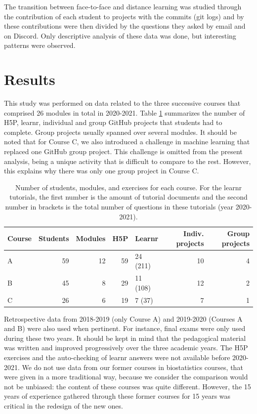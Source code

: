 \documentclass{aims}
\theoremstyle{definition}
\begin{document}
The transition between face-to-face and distance learning was studied
through the contribution of each student to projects with the commits
(git logs) and by these contributions were then divided by the questions
they asked by email and on Discord. Only descriptive analysis of these
data was done, but interesting patterns were observed.

\hypertarget{results}{%
\section{Results}\label{results}}

This study was performed on data related to the three successive courses
that comprised 26 modules in total in 2020-2021. Table
\ref {tab:tab_course} summarizes the number of H5P, learnr, individual
and group GitHub projects that students had to complete. Group projects
usually spanned over several modules. It should be noted that for Course
C, we also introduced a challenge in machine learning that replaced one
GitHub group project. This challenge is omitted from the present
analysis, being a unique activity that is difficult to compare to the
rest. However, this explains why there was only one group project in
Course C.

\begin{table}

\caption{\label{tab:tab_course_summary}\label{tab:tab_course} Number of students, modules, and exercises for each course. For the learnr tutorials, the first number is the amount of tutorial documents and the second number in brackets is the total number of questions in these tutorials (year 2020-2021).}
\centering
\begin{tabular}[t]{l|r|r|r|l|r|r}
\hline
Course & Students & Modules & H5P & Learnr & Indiv. projects & Group projects\\
\hline
A & 59 & 12 & 59 & 24 (211) & 10 & 4\\
\hline
B & 45 & 8 & 29 & 11 (108) & 12 & 2\\
\hline
C & 26 & 6 & 19 & 7 (37) & 7 & 1\\
\hline
\end{tabular}
\end{table}

Retrospective data from 2018-2019 (only Course A)
\cite{Grosjeandataset2018} and 2019-2020 (Courses A and B)
\cite{Grosjeandataset2019} were also used when pertinent. For instance,
final exams were only used during these two years. It should be kept in
mind that the pedagogical material was written and improved
progressively over the three academic years. The H5P exercises and the
auto-checking of learnr answers were not available before 2020-2021. We
do not use data from our former courses in biostatistics courses, that
were given in a more traditional way, because we consider the comparison
would not be unbiased: the content of these courses was quite different.
However, the 15 years of experience gathered through these former
courses for 15 years was critical in the redesign of the new ones.
\end{document}
